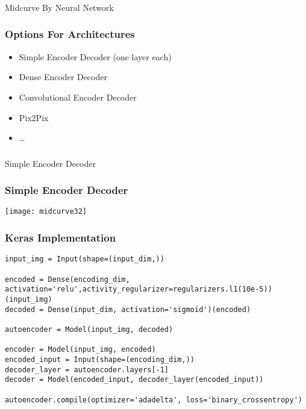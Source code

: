 \begin{frame}[fragile]\frametitle{}
\begin{center}
{\Large Midcurve By Neural Network}
\end{center}
\end{frame}

\begin{frame}[fragile]\frametitle{Options For Architectures}
	\begin{itemize}
	\item Simple Encoder Decoder (one layer each)
	\item Dense Encoder Decoder
	\item Convolutional Encoder Decoder
	\item Pix2Pix
	\item \ldots
	\end{itemize}	
\end{frame}

\begin{frame}[fragile]\frametitle{}
\begin{center}
{\Large Simple Encoder Decoder}
\end{center}
\end{frame}

\begin{frame}[fragile]\frametitle{Simple Encoder Decoder}

\begin{center}
\texttt{[image: midcurve32]}
\end{center}	
\end{frame}

\begin{frame}[fragile]\frametitle{Keras Implementation}

\begin{lstlisting}
input_img = Input(shape=(input_dim,))
    
encoded = Dense(encoding_dim, activation='relu',activity_regularizer=regularizers.l1(10e-5))(input_img)
decoded = Dense(input_dim, activation='sigmoid')(encoded) 
    
autoencoder = Model(input_img, decoded)
            
encoder = Model(input_img, encoded)
encoded_input = Input(shape=(encoding_dim,))
decoder_layer = autoencoder.layers[-1]
decoder = Model(encoded_input, decoder_layer(encoded_input))
    
autoencoder.compile(optimizer='adadelta', loss='binary_crossentropy')
\end{lstlisting}	
\end{frame}

